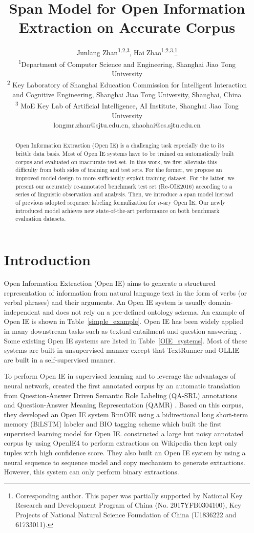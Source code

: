 \documentclass[letterpaper]{article} %
\title{Span Model for Open Information Extraction on Accurate Corpus}
\author{Junlang Zhan\textsuperscript{\rm 1,\rm 2,\rm 3}, Hai Zhao\textsuperscript{\rm 1,\rm 2,\rm 3,}\thanks{Corresponding author. This paper was partially supported by National Key Research and Development Program of China (No. 2017YFB0304100),
Key Projects of National Natural Science Foundation of China (U1836222 and 61733011).}\\ %
\textsuperscript{\rm 1}Department of Computer Science and Engineering, Shanghai Jiao Tong University\\ %
\textsuperscript{\rm 2} Key Laboratory of Shanghai Education Commission for Intelligent Interaction \\
and Cognitive Engineering, Shanghai Jiao Tong University, Shanghai, China \\
\textsuperscript{\rm 3} MoE Key Lab of Artificial Intelligence, AI Institute, Shanghai Jiao Tong University \\
longmr.zhan@sjtu.edu.cn, zhaohai@cs.sjtu.edu.cn %
}
\begin{document}
\maketitle

\begin{abstract}
Open Information Extraction (Open IE) is a challenging task especially due to its brittle data basis. Most of Open IE systems have to be trained on automatically built corpus and evaluated on inaccurate test set. In this work, we first alleviate this difficulty from both sides of training and test sets. For the former, we propose an improved model design to more sufficiently exploit training dataset. For the latter, we present our accurately re-annotated benchmark test set (Re-OIE2016) according to a series of linguistic observation and analysis. Then, we introduce a span model instead of previous adopted sequence labeling formulization for $n$-ary Open IE. Our newly introduced model achieves new state-of-the-art performance on both benchmark evaluation datasets.
\end{abstract}

\section{Introduction}
Open Information Extraction (Open IE) aims to generate a structured representation of information from natural language text in the form of verbs (or verbal phrases) and their arguments. An Open IE system is usually domain-independent and does not rely on a pre-defined ontology schema. An example of Open IE is shown in Table~\ref{simple_example}. Open IE has been widely applied in many downstream tasks such as textual entailment and question answering \cite{Fader2014OpenQA}. Some existing Open IE systems are listed in Table~\ref{OIE_systems}. Most of these systems are built in unsupervised manner except that TextRunner and OLLIE are built in a self-supervised manner.

To perform Open IE in supervised learning and to leverage the advantages of neural network, \cite{Stanovsky2018SupervisedOI} created the first annotated corpus by an automatic translation from Question-Answer Driven Semantic Role Labeling (QA-SRL) annotations \cite{He2015QuestionAnswerDS} and Question-Answer Meaning Representation (QAMR) \cite{Michael2018CrowdsourcingQM}. Based on this corpus, they developed an Open IE system RnnOIE using a bidirectional long short-term memory (BiLSTM) labeler and BIO tagging scheme which built the first supervised learning model for Open IE. \cite{Cui2018NeuralOI} constructed a large but noisy annotated corpus by using OpenIE4 to perform extractions on Wikipedia then kept only tuples with high confidence score. They also built an Open IE system by using a neural sequence to sequence model and copy mechanism to generate extractions. However, this system can only perform binary extractions.
\end{document}
